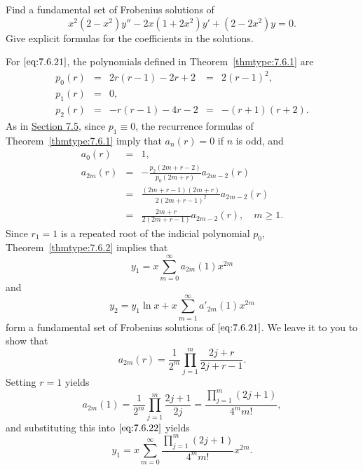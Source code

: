 \documentclass{ximera}
\begin{document}
\begin{example}\label{example:7.6.3}
Find a fundamental set of Frobenius  solutions of
\begin{equation} \label{eq:7.6.21}
x^2(2-x^2)y''-2x(1+2x^2)y'+(2-2x^2)y=0.
\end{equation}
Give explicit formulas for the coefficients in the solutions.

\begin{explanation}
For $\eqref{eq:7.6.21}$, the polynomials defined in
Theorem~\ref{thmtype:7.6.1} are
$$
\begin{array}{ccccc}
p_0(r)&=&2r(r-1)-2r+2&=&2(r-1)^2,\\
p_1(r)&=&0,\\
p_2(r)&=&-r(r-1)-4r-2&=&-(r+1)(r+2).
\end{array}
$$
As in \href{https://xerxes.ximera.org/differentialequations/main/frobeniusI/frobeniusI}{Section 7.5}, since $p_1\equiv0$, the recurrence formulas
of Theorem~\ref{thmtype:7.6.1} imply that $a_n(r)=0$ if $n$ is odd, and
$$
\begin{array}{ccl}
a_0(r)&=&1,\\
a_{2m}(r)&=&-\frac{p_2(2m+r-2)}{p_0(2m+r)}a_{2m-2}(r)\\
&=&\frac{(2m+r-1)(2m+r)}{2(2m+r-1)^2}a_{2m-2}(r)\\
&=&\frac{2m+r}{2(2m+r-1)}a_{2m-2}(r),\quad m\geq 1.
\end{array}
$$
Since $r_1=1$ is a repeated root of the indicial polynomial $p_0$,
Theorem~\ref{thmtype:7.6.2} implies that
\begin{equation} \label{eq:7.6.22}
y_1=x\sum_{m=0}^\infty  a_{2m}(1)x^{2m}
\end{equation}
and
\begin{equation} \label{eq:7.6.23}
y_2=y_1\ln x+x\sum_{m=1}^\infty a'_{2m}(1)x^{2m}
\end{equation}
form a fundamental set of Frobenius solutions of $\eqref{eq:7.6.21}$.
We leave it to you to show  that
\begin{equation} \label{eq:7.6.24}
a_{2m}(r)=\frac{1}{2^m}\prod_{j=1}^m\frac{2j+r}{2j+r-1}.
\end{equation}
Setting $r=1$ yields
\begin{equation} \label{eq:7.6.25}
a_{2m}(1)=\frac{1}{2^m}\prod_{j=1}^m\frac{2j+1}{2j}
=\frac{\prod_{j=1}^m(2j+1)}{4^mm!},
\end{equation}
and substituting this into $\eqref{eq:7.6.22}$ yields
$$
y_1=x\sum_{m=0}^\infty\frac{\prod_{j=1}^m(2j+1)}{4^mm!}x^{2m}.
$$


\end{explanation}
\end{example}
\end{document}
